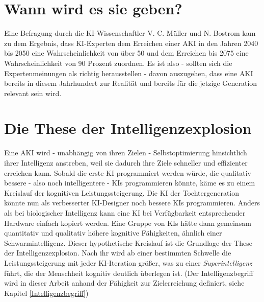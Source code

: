 \section{Wann wird es sie geben?}
Eine Befragung durch die KI-Wissenschaftler V. C. Müller und N. Bostrom kam zu dem Ergebnis, dass KI-Experten dem Erreichen einer AKI in den Jahren 2040 bis 2050 eine Wahrscheinlichkeit von über 50 und dem Erreichen bis 2075 eine Wahrscheinlichkeit von 90 Prozent zuordnen.  Es ist also - sollten sich die Expertenmeinungen als richtig herausstellen - davon auszugehen, dass eine AKI bereits in diesem Jahrhundert zur Realität und bereits für die jetzige Generation relevant sein wird. 

\section{Die These der Intelligenzexplosion}
Eine AKI wird - unabhängig von ihren Zielen - Selbstoptimierung hinsichtlich ihrer Intelligenz anstreben, weil sie dadurch ihre Ziele schneller und effizienter erreichen kann. Sobald die erste KI programmiert werden würde, die qualitativ bessere - also noch intelligentere - KIs programmieren könnte, käme es zu einem Kreislauf der kognitiven Leistungssteigerung. Die KI der Tochtergeneration könnte nun als verbesserter KI-Designer noch bessere KIs programmieren. Anders als bei biologischer Intelligenz kann eine KI bei Verfügbarkeit entsprechender Hardware einfach kopiert werden. Eine Gruppe von KIs hätte dann gemeinsam quantitativ und qualitativ höhere kognitive Fähigkeiten, ähnlich einer Schwarmintelligenz. Dieser hypothetische Kreislauf ist die Grundlage der These der Intelligenzexplosion. Nach ihr wird ab einer bestimmten Schwelle die Leistungssteigerung mit jeder KI-Iteration größer, was zu einer \emph{Superintelligenz} führt, die der Menschheit kognitiv deutlich überlegen ist. (Der Intelligenzbegriff wird in dieser Arbeit anhand der Fähigkeit zur Zielerreichung definiert, siehe Kapitel \ref{Intelligenzbegriff}) 

